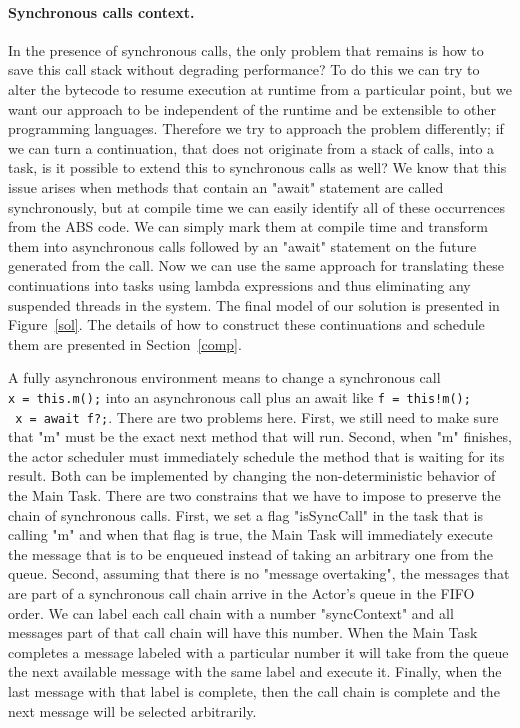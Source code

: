 \paragraph{Synchronous calls context.}

In the presence of synchronous calls, the only problem that remains is how to save this call stack without degrading performance? To do this we can try to alter the bytecode to resume execution at runtime from a particular point, but we want our approach to be independent of the runtime and be extensible to other programming languages. Therefore we try to approach the problem differently; if we can turn a continuation, that does not originate from a stack of calls, into a task, is it possible to extend this to synchronous calls as well? We know that this issue arises when methods that contain an "await" statement are called synchronously, but at compile time we can easily identify all of these occurrences from the ABS code. We can simply mark them at compile time and transform them into asynchronous calls followed by an "await" statement on the future generated from the call. Now we can use the same approach for translating these continuations into tasks using lambda expressions and thus eliminating any suspended threads in the system. The final model of our solution is presented in Figure~\ref{sol}. The details of how to construct these continuations and schedule them are presented in Section~\ref{comp}. 
\par A fully asynchronous environment means to change a synchronous call \\ \lstinline|x = this.m();| into an asynchronous call plus an await like \lstinline|f = this!m();| \\ \lstinline| x = await f?;|. There are two problems here. First, we still need to make sure that "m" must be the exact next method that will run. Second, when "m" finishes, the actor scheduler must immediately schedule the method that is waiting for its result. Both can be implemented by changing the non-deterministic behavior of the Main Task. There are two constrains that we have to impose to preserve the chain of synchronous calls. First, we set a flag "isSyncCall" in the task that is calling "m" and when that flag is true, the Main Task will immediately execute the message that is to be enqueued instead of taking an arbitrary one from the queue. Second, assuming that there is no "message overtaking", the messages that are part of a synchronous call chain arrive in the Actor's queue in the FIFO order. We can label each call chain with a number "syncContext" and all messages part of that call chain will have this number. When the Main Task completes a message labeled with a particular number it will take from the queue the next available message with the same label and execute it. Finally, when the last message with that label is complete, then the call chain is complete and the next message will be selected arbitrarily.

